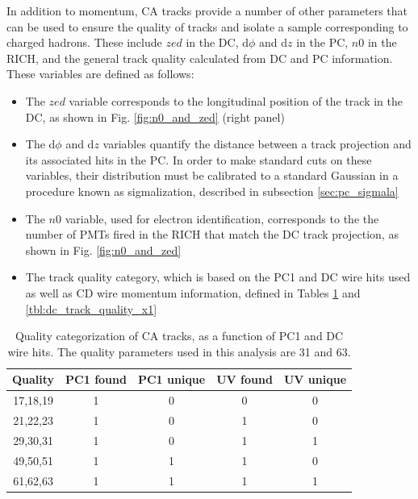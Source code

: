 In addition to momentum, CA tracks provide a number of other parameters that can be used to ensure the quality of tracks and isolate a sample corresponding to charged hadrons. These include $zed$ in the DC, d$\phi$ and d$z$ in the PC, $n0$ in the RICH, and the general track quality calculated from DC and PC information. These variables are defined as follows:
\begin{itemize}
\item The $zed$ variable corresponds to the longitudinal position of the track in the DC, as shown in Fig. \ref{fig:n0_and_zed} (right panel)
\item The d$\phi$ and d$z$ variables quantify the distance between a track projection and its associated hits in the PC. In order to make standard cuts on these variables, their distribution must be calibrated to a standard Gaussian in a procedure known as sigmalization, described in subsection \ref{sec:pc_sigmala}
\item The $n0$ variable, used for electron identification, corresponds to the the number of PMTs fired in the RICH that match the DC track projection, as shown in Fig. \ref{fig:n0_and_zed}
\item The track quality category, which is based on the PC1 and DC wire hits used as well as CD wire momentum information, defined in Tables \ref{tbl:dc_track_quality_pc1} and \ref{tbl:dc_track_quality_x1}
\end{itemize}

\begin{table}[h!]
\caption{Quality categorization of CA tracks, as a function of PC1 and DC wire hits. The quality parameters used in this analysis are 31 and 63.}
\begin{center}
    \begin{tabular}{ccccc}
    \hline
    Quality & PC1 found  & PC1 unique & UV found & UV unique\\ \hline
    17,18,19 & 1 & 0 & 0 & 0\\ \hline
    21,22,23 & 1 & 0 & 1 & 0\\ \hline
    29,30,31 & 1 & 0 & 1 & 1\\ \hline
    49,50,51 & 1 & 1 & 1 & 0\\ \hline
    61,62,63 & 1 & 1 & 1 & 1\\ \hline
    \end{tabular}
\end{center}
\label{tbl:dc_track_quality_pc1}
\end{table}

